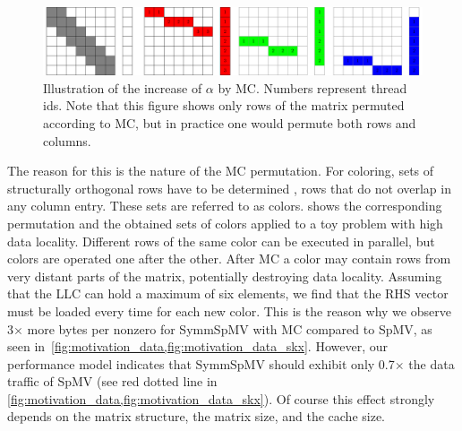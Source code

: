   \begin{figure}[t]
  	\centering
  	\includegraphics[scale=0.45]{pics/mc_alpha_problem/mc_alpha_unsymm}
  	\caption{Illustration of the increase of $\alpha$ by \acrshort{MC}. Numbers represent thread ids. Note that this figure shows only rows of the matrix permuted according to \acrshort{MC}, but in practice one would permute both rows and columns.}
  	\label{fig:mc_alpha}
  \end{figure}
  
The reason for this is the nature of the \acrshort{MC}
permutation. For \DTWO coloring, sets of structurally orthogonal
rows have to be determined \cite{dist_k_def}, \ie rows that do not
overlap in any column entry. These sets are referred to as colors.  shows the corresponding permutation
and the obtained sets of colors applied to a toy problem with high
data locality. Different rows of the same color can be executed in
parallel, but colors are operated one after the
other. After \acrshort{MC} a color may contain rows from very distant
parts of the matrix, potentially destroying data locality.  Assuming
that the \acrshort{LLC} can hold a maximum of six elements, we find
that the RHS vector must be loaded every time for each
new color. This is the reason why we observe 3$\times$ more bytes
per nonzero for \acrshort{SymmSpMV} with \acrshort{MC} compared
to \acrshort{SpMV}, as seen in~\cref{fig:motivation_data,fig:motivation_data_skx}.  However,
our performance model indicates that \acrshort{SymmSpMV} should
exhibit only 0.7$\times$ the data traffic of \acrshort{SpMV} (see
red dotted line in \cref{fig:motivation_data,fig:motivation_data_skx}). Of course this
effect strongly depends on the matrix structure, the matrix size, and
the cache size.
        
